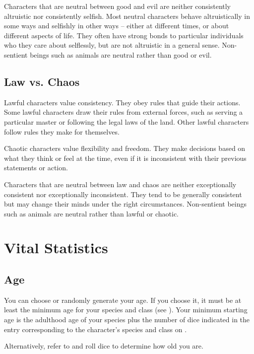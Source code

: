         Characters that are neutral between good and evil are neither consistently altruistic nor consistently selfish.
        Most neutral characters behave altruistically in some ways and selfishly in other ways -- either at different times, or about different aspects of life.
        They often have strong bonds to particular individuals who they care about selflessly, but are not altruistic in a general sense.
        Non-sentient beings such as animals are neutral rather than good or evil.

    \subsection{Law vs. Chaos}
         Lawful characters value consistency.
        They obey rules that guide their actions.
        Some lawful characters draw their rules from external forces, such as serving a particular master or following the legal laws of the land.
        Other lawful characters follow rules they make for themselves.

         Chaotic characters value flexibility and freedom.
        They make decisions based on what they think or feel at the time, even if it is inconsistent with their previous statements or action.

         Characters that are neutral between law and chaos are neither exceptionally consistent nor exceptionally inconsistent.
        They tend to be generally consistent but may change their minds under the right circumstances.
        Non-sentient beings such as animals are neutral rather than lawful or chaotic.

\section{Vital Statistics}

    \subsection{Age}
        You can choose or randomly generate your age.
        If you choose it, it must be at least the minimum age for your species and class (see ). Your minimum starting age is the adulthood age of your species plus the number of dice indicated in the entry corresponding to the character's species and class on .

        Alternatively, refer to  and roll dice to determine how old you are.

